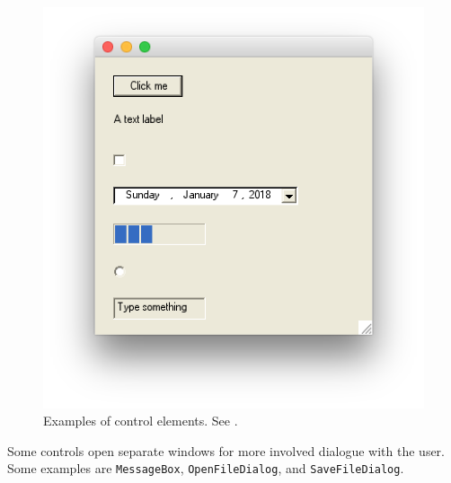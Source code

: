 \documentclass[fsharpnotes.tex]{subfiles}
\begin{document}
\begin{figure}
  \centering
  \includegraphics[scale=0.3]{controls}
  \caption{Examples of control elements. See .}
  \label{fig:controls}
\end{figure}

Some controls open separate windows for more involved dialogue with the user. Some examples are \lstinline{MessageBox}, \lstinline{OpenFileDialog}, and \lstinline{SaveFileDialog}.
\end{document}
